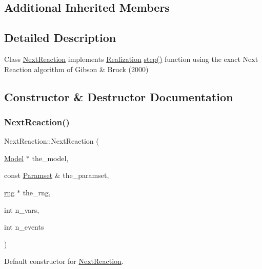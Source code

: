 \subsection*{Additional Inherited Members}


\subsection{Detailed Description}
Class \hyperlink{class_next_reaction}{Next\+Reaction} implements \hyperlink{class_realization}{Realization} \hyperlink{class_next_reaction_a2c1502879c76efe398c2947056936725}{step()} function using the exact Next Reaction algorithm of Gibson \& Bruck (2000) 

\subsection{Constructor \& Destructor Documentation}
\mbox{\label{class_next_reaction_ac08695146983c863c3edf3bb4e61d9f9}} 
\subsubsection{\texorpdfstring{Next\+Reaction()}{NextReaction()}}
{\footnotesize\ttfamily Next\+Reaction\+::\+Next\+Reaction (\begin{DoxyParamCaption}\item[{\hyperlink{class_model}{Model} $\ast$}]{the\+\_\+model,  }\item[{const \hyperlink{class_paramset}{Paramset} \&}]{the\+\_\+paramset,  }\item[{\hyperlink{classrng}{rng} $\ast$}]{the\+\_\+rng,  }\item[{int}]{n\+\_\+vars,  }\item[{int}]{n\+\_\+events }\end{DoxyParamCaption})}



Default constructor for \hyperlink{class_next_reaction}{Next\+Reaction}. 


